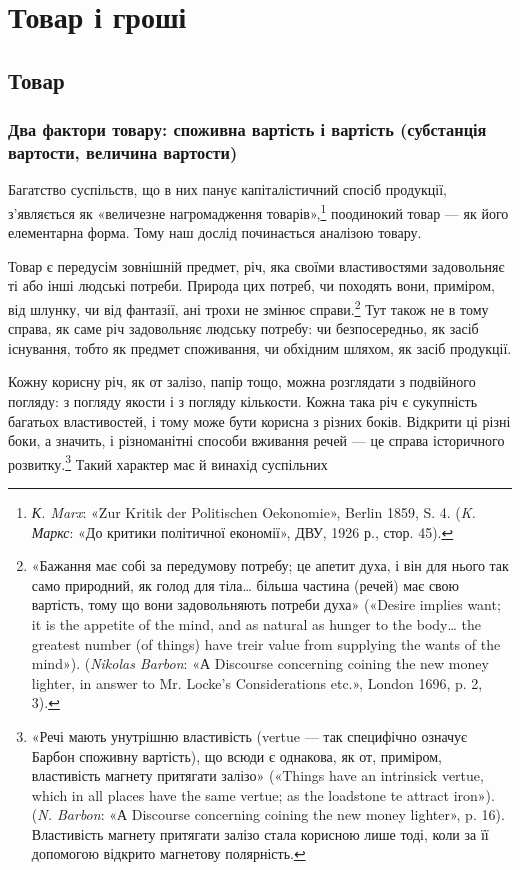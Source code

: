 \chapter{Товар і гроші}
\section{Товар}
\subsection{Два фактори товару: споживна вартість і вартість (субстанція
вартости, величина вартости)}

Багатство суспільств, що в них панує капіталістичний спосіб
продукції, з’являється як «величезне нагромадження товарів»,\footnote{
\emph{К. Marx}: «Zur Kritik der Politischen Oekonomie», Berlin 1859,
S. 4. (\emph{K. Маркс}: «До критики політичної економії», ДВУ, 1926 р.,
стор. 45).
}
поодинокий товар — як його елементарна форма. Тому наш
дослід починається аналізою товару.

Товар є передусім зовнішній предмет, річ, яка своїми властивостями
задовольняє ті або інші людські потреби. Природа цих
потреб, чи походять вони, приміром, від шлунку, чи від фантазії,
ані трохи не змінює справи.\footnote{
«Бажання має собі за передумову потребу; це апетит духа, і він
для нього так само природний, як голод для тіла\dots{} більша частина (речей)
має свою вартість, тому що вони задовольняють потреби духа» («Desire
implies want; it is the appetite of the mind, and as natural as hunger to
the body\dots{} the greatest number (of things) have treir value from supplying
the wants of the mind»). (\emph{Nikolas Barbon}: «А Discourse concerning coining
the new money lighter, in answer to Mr. Locke’s Considerations
etc.», London 1696, p. 2, 3).
} Тут також не в тому справа, як саме
річ задовольняє людську потребу: чи безпосередньо, як засіб
існування, тобто як предмет споживання, чи обхідним шляхом,
як засіб продукції.

Кожну корисну річ, як от залізо, папір тощо, можна розглядати
з подвійного погляду: з погляду якости і з погляду кількости.
Кожна така річ є сукупність багатьох властивостей, і тому
може бути корисна з різних боків. Відкрити ці різні боки, а значить,
і різноманітні способи вживання речей — це справа історичного
розвитку.\footnote{
«Речі мають унутрішню властивість (vertue — так специфічно
означує Барбон споживну вартість), що всюди є однакова, як от, приміром,
властивість магнету притягати залізо» («Things have an intrinsick vertue,
which in all places have the same vertue; as the loadstone te attract iron»).
(\emph{N. Barbon}: «А Discourse concerning coining the new money lighter»,
p. 16). Властивість магнету притягати залізо стала корисною лише тоді,
коли за її допомогою відкрито магнетову полярність.
} Такий характер має й винахід суспільних
\parbreak{}  %
